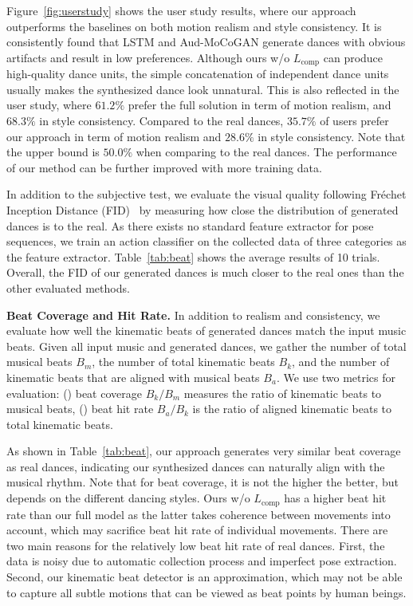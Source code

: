 \documentclass{article}
\newcommand{\figref}[1]{Figure~\ref{fig:#1}}
\newcommand{\tabref}[1]{Table~\ref{tab:#1}}
\begin{document}
\figref{userstudy} shows the user study results, where our approach outperforms the baselines on both motion realism and style consistency.
It is consistently found that LSTM and Aud-MoCoGAN generate dances with obvious artifacts and result in low preferences.
Although ours w/o $L_{\mathrm{comp}}$ can produce high-quality dance units, the simple concatenation of independent dance units usually makes the synthesized dance look unnatural.
This is also reflected in the user study, where $61.2\%$ prefer the full solution in term of motion realism, and $68.3\%$ in style consistency. 
Compared to the real dances, $35.7\%$ of users prefer our approach in term of motion realism and $28.6\%$ in style consistency. Note that the upper bound is $50.0\%$ when comparing to the real dances. 
The performance of our method can be further improved with more training data.

In addition to the subjective test, we evaluate the visual quality following Fr\'echet Inception Distance (FID)~\cite{fid} by measuring how close the distribution of generated dances is to the real.
As there exists no standard feature extractor for pose sequences, 
we train an action classifier on the collected data of three categories as the feature extractor.
\tabref{beat} shows the average results of 10 trials. 
Overall, the FID of our generated dances is much closer to the real ones than the other evaluated methods.   


\textbf{Beat Coverage and Hit Rate.}
In addition to realism and consistency, we evaluate how well the kinematic beats of generated dances match the input music beats.
Given all input music and generated dances, we gather the number of total musical beats $B_m$, the number of total kinematic beats $B_k$, and the number of kinematic beats that are aligned with musical beats $B_{a}$.
We use two metrics for evaluation:
() beat coverage $B_k/B_m$ measures the ratio of kinematic beats to musical beats,
() beat hit rate $B_a/B_k$ is the ratio of aligned kinematic beats to total kinematic beats. 

As shown in \tabref{beat}, our approach generates very similar beat coverage as real dances, indicating our synthesized dances can naturally align with the musical rhythm. 
Note that for beat coverage, it is not the higher the better, but depends on the different dancing styles. 
Ours w/o $L_{\mathrm{comp}}$ has a higher beat hit rate than our full model as the latter takes coherence between movements into account, which may sacrifice beat hit rate of individual movements. There are two main reasons for the relatively low beat hit rate of real dances. First, the data is noisy due to automatic collection process and imperfect pose extraction. Second, our kinematic beat detector is an approximation, which may not be able to capture all subtle motions that can be viewed as beat points by human beings.      
\end{document}
